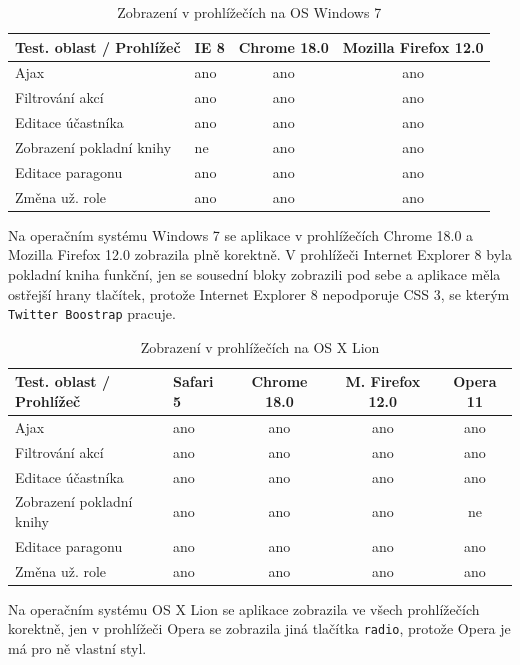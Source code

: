 \documentclass[thesis=B,czech]{FITthesis}[2011/06/14]
\begin{document}
 \begin{table}[h]\centering
 	\caption{Zobrazení v prohlížečích na OS Windows 7}\label{tab:browsersWin}
 	\begin{tabular}{| l | l | c | c  | }\hline
 		Test. oblast / Prohlížeč	& IE 8		& Chrome 18.0		& Mozilla Firefox 12.0	\tabularnewline \hline
		Ajax 						& ano		& ano			& ano				\tabularnewline \hline
		Filtrování akcí				& ano		& ano			& ano				\tabularnewline \hline
		Editace účastníka 			& ano		& ano			& ano				\tabularnewline \hline
		Zobrazení pokladní knihy 	& ne			& ano			& ano				\tabularnewline \hline
		Editace paragonu 			& ano		& ano			& ano				\tabularnewline \hline
		Změna už. role 			& ano		& ano			& ano				\tabularnewline \hline
 	\end{tabular}
 \end{table}

Na operačním systému Windows 7 se aplikace v prohlížečích Chrome 18.0 a Mozilla Firefox 12.0 zobrazila plně korektně. V prohlížeči Internet Explorer 8 byla pokladní kniha funkční, jen se sousední bloky zobrazili pod sebe a aplikace měla ostřejší hrany tlačítek, protože Internet Explorer 8 nepodporuje CSS 3, se kterým \texttt{Twitter Boostrap} pracuje.

 \begin{table}[h]\centering
 	\caption{Zobrazení v prohlížečích na OS X Lion}\label{tab:browsersMac}
 	\begin{tabular}{| l | l | c | c | c  | }\hline
 		Test. oblast / Prohlížeč		& Safari 5		& Chrome 18.0		& M. Firefox 12.0	& Opera 11 	\tabularnewline \hline
		Ajax						& ano		& ano			& ano			& ano		\tabularnewline \hline
		Filtrování akcí				& ano		& ano			& ano			& ano 		\tabularnewline \hline
		Editace účastníka 			& ano		& ano			& ano			& ano		\tabularnewline \hline
		Zobrazení pokladní knihy 	& ano		& ano			& ano			& ne			\tabularnewline \hline
		Editace paragonu 			& ano		& ano			& ano			& ano		\tabularnewline \hline
		Změna už. role 			& ano		& ano			& ano		 	& ano		\tabularnewline \hline
 	\end{tabular}
 \end{table}

Na operačním systému OS X Lion se aplikace zobrazila ve všech prohlížečích korektně, jen v prohlížeči Opera se zobrazila jiná tlačítka \texttt{radio}, protože Opera je má pro ně vlastní styl.

 





\begin{conclusion}
\end{conclusion}
\end{document}
